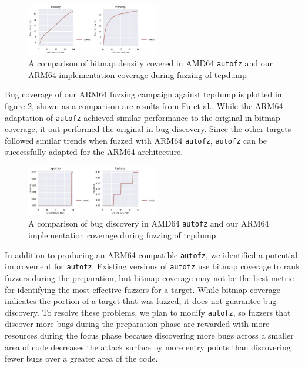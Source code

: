 \begin{figure}
    \includegraphics[width=0.52\textwidth]{figs/tcpdump_compare_orig_arm64.png}
    \centering
    \caption{A comparison of bitmap density covered in AMD64 \texttt{autofz} and our ARM64 implementation
    coverage during fuzzing of tcpdump}
    \label{fig:tcpdump_compare_orig_arm64}
\end{figure}

Bug coverage of our ARM64 fuzzing campaign against tcpdump is plotted in figure \ref{figs:tcp_compare_orig_arm64_ub.png}, 
shown as a comparison are results from Fu et al.\cite{fu_autofz_2023}. While the ARM64 adaptation of \texttt{autofz} achieved similar
performance to the original in bitmap coverage, it out performed the original in bug discovery. Since the other targets followed similar trends
when fuzzed with ARM64 \texttt{autofz}, \texttt{autofz} can be successfully adapted for the ARM64 architecture.

\begin{figure}
    \includegraphics[width=0.52\textwidth]{figs/tcpdump_compare_orig_arm64_ub.png}
    \centering
    \caption{A comparison of bug discovery in AMD64 \texttt{autofz} and our ARM64 implementation
    coverage during fuzzing of tcpdump}
    \label{figs:tcp_compare_orig_arm64_ub.png}
\end{figure}

In addition to producing an ARM64 compatible \texttt{autofz}, we identified a potential improvement for \texttt{autofz}.
Existing versions of \texttt{autofz} use bitmap coverage to rank fuzzers during the preparation, but bitmap
coverage may not be the best metric for identifying the most effective fuzzers for a target. While
bitmap coverage indicates the portion of a target that was fuzzed, it does not guarantee bug discovery.
To resolve these problems, we plan to modify \texttt{autofz}, so fuzzers that discover more bugs during the
preparation phase are rewarded with more resources during the focus phase because discovering more bugs
across a smaller area of code decreases the attack surface by more entry points than discovering fewer
bugs over a greater area of the code.